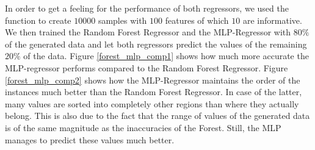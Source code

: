 	In order to get a feeling for the performance of both regressors, we used the function  to create $10000$ samples with $100$ features of which $10$ are informative. We then trained the Random Forest Regressor and the MLP-Regressor with $80\%$ of the generated data and let both regressors predict the values of the remaining $20\%$ of the data. Figure \ref{forest_mlp_comp1} shows how much more accurate the MLP-regressor performs compared to the Random Forest Regressor. Figure \ref{forest_mlp_comp2} shows how the MLP-Regressor maintains the order of the instances much better than the Random Forest Regressor. In case of the latter, many values are sorted into completely other regions than where they actually belong. This is also due to the fact that the range of values of the generated data is of the same magnitude as the inaccuracies of the Forest. Still, the MLP manages to predict these values much better.
\newpage
	